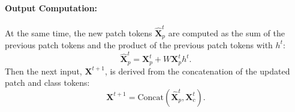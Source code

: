 \paragraph{Output Computation:} At the same time, the new patch tokens $\widehat{\boldsymbol{X}}_p^{t}$ are computed as the sum of the previous patch tokens and the product of the previous patch tokens with $h^t$:
\begin{equation}
    \widehat{\boldsymbol{X}}_p^{t} = \boldsymbol{X}^{t}_p + W\boldsymbol{X}^{t}_p h^t.
\end{equation}
Then the next input, $\boldsymbol{X}^{t+1}$, is derived from the concatenation of the updated patch and class tokens:
\begin{equation}
   \boldsymbol{X}^{t+1} = \text{Concat}(\widehat{\boldsymbol{X}}_p^{t},\boldsymbol{X}^{t}_c). 
\end{equation}



